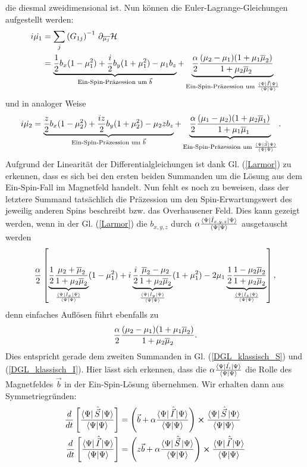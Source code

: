 die diesmal zweidimensional ist.
\noindent Nun können die Euler-Lagrange-Gleichungen aufgestellt werden:
\begin{align}
    i\dot{\mu_1} &= \sum_{j}\left(G_{1j}\right)^{-1}\thinspace \partial_{\overline{\mu_j}}\mathcal{H}  \\
    &=\underbrace{\frac{1}{2}b_x(1-\mu_1^2) + \frac{i}{2}b_y(1+\mu_1^2) -\mu_1 b_z}_{\text{Ein-Spin-Präzession um } \vec{b}} +\underbrace{\frac{\alpha}{2} \frac{(\mu_2-\mu_1)(1+\mu_1\overline{\mu}_2)}{1+\mu_2\overline{\mu}_2}}_{\text{Ein-Spin-Präzession um } \frac{\bra{\Psi}\hat{\vec{I}}\ket{\Psi}}{\bra{\Psi}\ket{\Psi}}  } \label{DGL_klassisch_S}   
\end{align}
und in analoger Weise 
\begin{align}
    i\dot{\mu_2} &= \underbrace{\frac{z}{2}b_x(1-\mu_2^2) + \frac{iz}{2}b_y(1+\mu_2^2) -\mu_2 z b_z}_{\text{Ein-Spin-Präzession um } \vec{b}} +\underbrace{\frac{\alpha}{2} \frac{(\mu_1-\mu_2)(1+\mu_2\overline{\mu}_1)}{1+\mu_1\overline{\mu}_1}}_{\text{Ein-Spin-Präzession um } \frac{\bra{\Psi}\hat{\vec{S}}\ket{\Psi}}{\bra{\Psi}\ket{\Psi}}  }.\label{DGL_klassisch_I}
\end{align}
\noindent Aufgrund der Linearität der Differentialgleichungen ist dank Gl. (\ref{Larmor}) zu erkennen, dass es sich bei den ersten
beiden Summanden um die Lösung aus dem Ein-Spin-Fall im Magnetfeld handelt. Nun fehlt es noch zu beweisen, dass der letztere Summand tatsächlich die 
Präzession um den Spin-Erwartungswert des jeweilig anderen Spins beschreibt bzw. das Overhausener Feld. Dies kann gezeigt werden, wenn in 
der Gl. (\ref{Larmor}) die $b_{x,y,z}$ durch $\alpha\frac{\bra{\Psi}\hat{I}_{x,y,z}\ket{\Psi}}{\bra{\Psi}\ket{\Psi}}$ ausgetauscht
werden
\begin{align}
     \frac{\alpha}{2}\left[\underbrace{\frac{1}{2}\frac{\mu_2 + \overline{\mu}_2}{1+\mu_2\overline{\mu}_2}}_{\frac{\bra{\Psi}\hat{I}_x\ket{\Psi}}{\bra{\Psi}\ket{\Psi}}}(1-\mu_1^2) 
     + i \underbrace{\frac{i}{2}\frac{\overline{\mu}_2 -\mu_2}{1+\mu_2\overline{\mu}_2}}_{\frac{\bra{\Psi}\hat{I}_y\ket{\Psi}}{\bra{\Psi}\ket{\Psi}}}(1+\mu_1^2) 
     - 2\mu_1\underbrace{\frac{1}{2}\frac{1-\mu_2\overline{\mu}_2}{1+\mu_2\overline{\mu}_2}}_{\frac{\bra{\Psi}\hat{I}_z\ket{\Psi}}{\bra{\Psi}\ket{\Psi}}} \right],
\end{align}
denn einfaches Auflösen führt ebenfalls zu
\begin{align}
    \frac{\alpha}{2} \frac{(\mu_2-\mu_1)(1+\mu_1\overline{\mu}_2)}{1+\mu_2\overline{\mu}_2}.
\end{align}
Dies entspricht gerade dem zweiten Summanden in Gl. (\ref{DGL_klassisch_S}) und (\ref{DGL_klassisch_I}).
Hier lässt sich erkennen, dass die $\alpha\frac{\bra{\Psi}\hat{I_i}\ket{\Psi}}{\bra{\Psi}\ket{\Psi}}$ die Rolle des Magnetfeldes $\vec{b}$ in der Ein-Spin-Lösung 
übernehmen. Wir erhalten dann aus Symmetriegründen:
\begin{align}
    \frac{d}{dt}\left[\frac{\bra{\Psi}\hat{\vec{S}}\ket{\Psi}}{\bra{\Psi}\ket{\Psi}}\right] &= \left(\vec{b} + \alpha \frac{\bra{\Psi}\hat{\vec{I}}\ket{\Psi}}{\bra{\Psi}\ket{\Psi}}\right)\cross\frac{\bra{\Psi}\hat{\vec{S}}\ket{\Psi}}{\bra{\Psi}\ket{\Psi}} \label{DGL_1}\\
    \frac{d}{dt}\left[\frac{\bra{\Psi}\hat{\vec{I}}\ket{\Psi}}{\bra{\Psi}\ket{\Psi}}\right] &= \left(z\vec{b} + \alpha \frac{\bra{\Psi}\hat{\vec{S}}\ket{\Psi}}{\bra{\Psi}\ket{\Psi}}\right)\cross\frac{\bra{\Psi}\hat{\vec{I}}\ket{\Psi}}{\bra{\Psi}\ket{\Psi}} \label{DGL_2}
\end{align}


